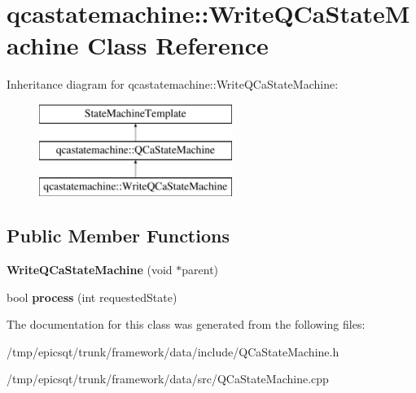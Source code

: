 \hypertarget{classqcastatemachine_1_1WriteQCaStateMachine}{
\section{qcastatemachine::WriteQCaStateMachine Class Reference}
\label{classqcastatemachine_1_1WriteQCaStateMachine}
}
Inheritance diagram for qcastatemachine::WriteQCaStateMachine:\begin{figure}[H]
\begin{center}
\leavevmode
\includegraphics[height=3.000000cm]{classqcastatemachine_1_1WriteQCaStateMachine}
\end{center}
\end{figure}
\subsection*{Public Member Functions}
\begin{DoxyCompactItemize}
\item 
\hypertarget{classqcastatemachine_1_1WriteQCaStateMachine_a5aca6c7566869dc38693e796351ac801}{
{\bfseries WriteQCaStateMachine} (void $\ast$parent)}
\label{classqcastatemachine_1_1WriteQCaStateMachine_a5aca6c7566869dc38693e796351ac801}

\item 
\hypertarget{classqcastatemachine_1_1WriteQCaStateMachine_a9b7aab6b3c14cb7372717b5a38176014}{
bool {\bfseries process} (int requestedState)}
\label{classqcastatemachine_1_1WriteQCaStateMachine_a9b7aab6b3c14cb7372717b5a38176014}

\end{DoxyCompactItemize}


The documentation for this class was generated from the following files:\begin{DoxyCompactItemize}
\item 
/tmp/epicsqt/trunk/framework/data/include/QCaStateMachine.h\item 
/tmp/epicsqt/trunk/framework/data/src/QCaStateMachine.cpp\end{DoxyCompactItemize}
